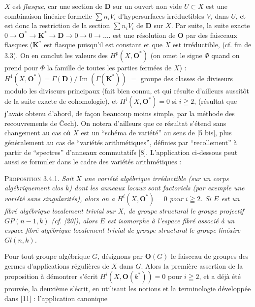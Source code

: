 
\noindent $X$ est \textit{flasque}, car une section de $\mathbf D$ sur un ouvert non
vide $U\subset X$ est une combinaison linéaire formelle
$\sum n_iV_i$ d'hypersurfaces irréductibles $V_i$ dans $U$, et est donc la
restriction de la section $\sum n_iV_i$ de $\mathbf D$ sur $X$. Par suite,
la suite exacte 
$0\to\mathbf O^*\to\mathbf K^*\to\mathbf D\to0\to0\to\ldots.$
est une résolution de $\mathbf O$ par des faisceaux flasques ($\mathbf K^*$
est flasque puisqu'il est constant et que $X$ est irréductible, (cf. fin de
3.3). On en conclut les valeurs des $H^p(X,\mathbf O^*)$ (on omet le signe
$\Phi$ quand on prend pour $\Phi$ la famille de toutes les parties fermées de
$X$) :
$H^1(X,\mathbf O^*)=\Gamma(\mathbf D)/\operatorname{Im}(\Gamma(\mathbf K^*))$
$={}$ groupe des classes de diviseurs modulo les diviseurs principaux (fait
bien connu, et qui résulte d'ailleurs aussitôt de la suite exacte de
cohomologie), et $H^i(X,\mathbf O^*)=0$ si $i\geqq2$, (résultat que j'avais
obtenu d'abord, de façon beaucoup moins simple, par la méthode des
recouvrements de Čech). On notera d'ailleurs que ce résultat s'étend sans
changement au cas où $X$ est un ``schéma de variété'' au sens de
[5 bis], plus généralement au cas de ``variétés arithmétiques'',
définies par ``recollement'' à partir de ``spectres'' d'anneaux
commutatifs [8]. L'application ci-dessous peut aussi se formuler dans le
cadre des variétés arithmétiques :

\indent\textsc{Proposition 3.4.1.} \textit{Soit $X$ une variété algébrique
irréductible \textup{(}sur un corps algébriquement clos $k$\textup{)} dont les anneaux locaux
sont factoriels \textup{(}par exemple une variété sans singularités\textup{)}, alors on a
$H^i(X,\mathbf O^*)=0$ pour $i\geqq2$. Si $E$ est un fibré algébrique
localement trivial sur $X$, de groupe structural le groupe projectif
$\mathit{GP}(n-1,k)$ \textup{(}cf. \textup{[20])}, alors $E$ est isomorphe à l'espace
fibré associé à un espace fibré algébrique localement trivial de groupe
structural le groupe linéaire $\mathit{Gl}(n,k)$.}

Pour tout groupe algébrique $G$, désignons par $\mathbf O(G)$ le faisceau de
groupes des germes d'applications régulières de $X$ dans $G$. Alors la
première assertion de la proposition à démontrer s'écrit
$H^i(X,\mathbf O(k^*))=0$ pour $i\geqq2$, et a déjà été prouvée, la deuxième
s'écrit, en utilisant les notions et la terminologie développée dans [11] :
l'application canonique


